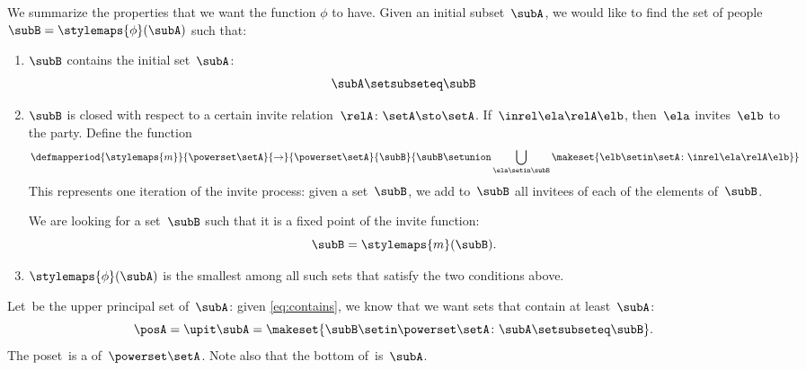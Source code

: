 We summarize the properties that we want the function $\phi$ to have.
Given an initial subset~$\subA$, we would like to find the set of people~$\subB = \stylemaps{\phi}(\subA)$ such that:
\begin{enumerate}
    \item $\subB$ contains the initial set~$\subA$:
          \begin{equation}
              \label{eq:contains}
              \subA \setsubseteq \subB
          \end{equation}
    \item $\subB$ is closed with respect to a certain invite relation~$\relA \colon \setA \sto \setA$.
          If~$\inrel \ela \relA \elb$, then~$\ela$ invites~$\elb$ to the party.
          Define the function
          \begin{equation}
              \defmapperiod{\stylemaps{m}}{\powerset \setA}{\to}{\powerset \setA
              }{
                  \subB
              }{
                  \subB \setunion \bigcup_{\ela \setin \subB} \makeset{ \elb \setin \setA \colon \inrel \ela \relA \elb}
              }
          \end{equation}
          This represents one iteration of the invite process: given a set~$\subB$, we add to~$\subB$ all invitees of each of the elements of~$\subB$.

          We are looking for a set~$\subB$ such that it is a fixed point of the invite function:
          \begin{equation}
              \subB = \stylemaps{m}(\subB).
          \end{equation}

    \item $\stylemaps{\phi}(\subA)$ is the smallest among all such sets that satisfy the two conditions above.
\end{enumerate}

Let~\posA be the upper principal set of~$\subA$: given \cref{eq:contains}, we know that we want sets that contain at least~$\subA$:
\begin{equation}
    \posA = \upit \subA = \makeset{ \subB \setin \powerset \setA \colon \subA \setsubseteq \subB }.
\end{equation}
The poset~\posA is a  of~$\powerset \setA$.
Note also that the bottom of~\posA is~$\subA$.

